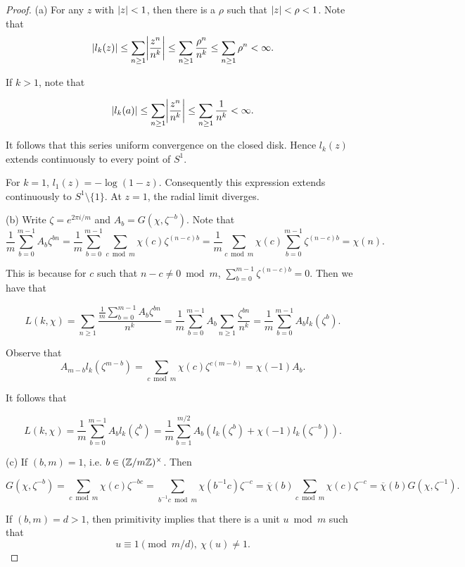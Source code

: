 \begin{proof}
  (a) For any $z$ with $\lvert z\rvert < 1$, then there is a $\rho$ such that $\lvert z\rvert < \rho < 1$.
  Note that
  \[\abs{l_k(z)} \le \sum_{n \ge 1} \abs*{\frac{z^n}{n^k}} \le  \sum_{n\ge 1} \frac{\rho^n}{n^k}
  \le \sum_{n\ge 1} \rho ^n < \infty.  \]

  If $k > 1$, note that

  \[\abs{l_k(a)} \le \sum_{n \ge 1} \abs*{\frac{z^n}{n^k}} \le \sum_{n\ge 1} \frac{1}{n^k}
  < \infty. \]

  It follows that this series uniform convergence on the closed disk. Hence $l_k(z)$ extends
  continuously to every point of $S^1$.

  For $k = 1$, $l_1(z) = -\log (1-z)$. Consequently this expression extends continuously to
  $S^1\setminus\{1\}$. At $z=1$, the radial limit diverges.

  (b) Write $\zeta = e^{2\pi i / m}$ and $A_b = G(\chi, \zeta^{-b})$. Note that
  \[\frac{1}{m} \sum_{b=0}^{m-1} A_b \zeta^{bn} = \frac{1}{m} \sum_{b=0}^{m-1}
  \sum_{c \bmod m} \chi(c) \zeta^{(n-c)b}= \frac{1}{m}\sum_{c \bmod m}
  \chi(c) \sum_{b=0}^{m-1}\zeta^{(n-c)b} = \chi(n).   \]

  This is because for $c$ such that $n - c \neq 0 \bmod m$, $\sum_{b=0}^{m-1} \zeta^{(n-c)b} = 0$.
  Then we have that

  \begin{equation}
    L(k, \chi) = \sum_{n\ge 1} \frac{\frac{1}{m} \sum_{b=0}^{m-1}A_b \zeta^{bn}}{n ^ k} =
  \frac{1}{m} \sum_{b=0}^{m-1} A_b \sum_{n\ge 1} \frac{\zeta^{bn}}{n^k} =
  \frac{1}{m} \sum_{b=0}^{m-1} A_b l_k(\zeta^b).
  \label{eq: ex14b}
  \end{equation}

  Observe that
  \[ A_{m-b} l_k(\zeta^{m-b}) = \sum_{c \bmod m} \chi(c) \zeta^{c(m-b)} = \chi(-1) A_b. \]

  It follows that

  \[L(k, \chi) = \frac{1}{m} \sum_{b=0}^{m-1}A_b l_k(\zeta^b) =
  \frac{1}{m} \sum_{b=1}^{m/2} A_b (l_k(\zeta^b) + \chi(-1) l_k(\zeta^{-b})).  \]

  (c) If $(b, m) = 1$, i.e. $b \in (\mathbb{Z} / m \mathbb{Z}) ^ \times$. Then

  \[G(\chi, \zeta^{-b}) = \sum_{c \bmod m} \chi(c) \zeta^{-bc} =
  \sum_{b^{-1} c \bmod m} \chi(b^{-1}c) \zeta^{-c} = \overline{\chi}(b)
  \sum_{c \bmod m} \chi(c) \zeta^{-c} = \overline{\chi}(b) G(\chi, \zeta^{-1}).  \]

  If $(b, m) = d > 1$, then primitivity implies that there is a unit $u \bmod m$ such that
  \[ u \equiv 1 \pmod{m / d}, \ \chi(u) \neq 1. \]


\end{proof}
